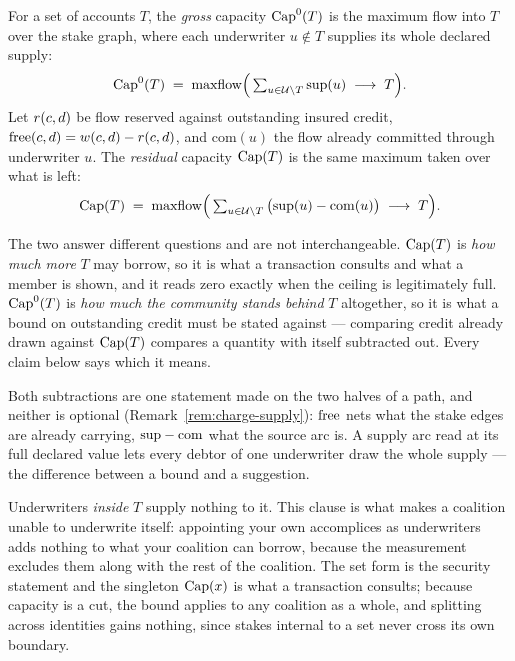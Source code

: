 \begin{definition}[Capacity]
\label{def:capacity}
For a set of accounts $T$, the \emph{gross} capacity $\mathrm{Cap}^{0}(T)$ is the maximum flow
into $T$ over the stake graph, where each underwriter $u \notin T$ supplies its whole
declared supply:
\[
  \mathrm{Cap}^{0}(T) \;=\; \mathrm{maxflow}\Big(\textstyle\sum_{u\in\mathcal{U}\setminus T}\mathrm{sup}(u)
  \;\longrightarrow\; T\Big).
\]
Let $r(c,d)$ be flow reserved against outstanding insured credit,
$\mathrm{free}(c,d) = w(c,d) - r(c,d)$, and $\mathrm{com}(u)$ the flow already committed
through underwriter $u$. The \emph{residual} capacity $\mathrm{Cap}(T)$ is the same maximum
taken over what is left:
\[
  \mathrm{Cap}(T) \;=\; \mathrm{maxflow}\Big(\textstyle\sum_{u\in\mathcal{U}\setminus T}
  \big(\mathrm{sup}(u)-\mathrm{com}(u)\big)
  \;\longrightarrow\; T\Big).
\]
\end{definition}

\begin{remark}
\label{rem:two-capacities}
The two answer different questions and are not interchangeable. $\mathrm{Cap}(T)$ is
\emph{how much more} $T$ may borrow, so it is what a transaction consults and what a
member is shown, and it reads zero exactly when the ceiling is legitimately full.
$\mathrm{Cap}^{0}(T)$ is \emph{how much the community stands behind} $T$ altogether, so it is
what a bound on outstanding credit must be stated against --- comparing credit already
drawn against $\mathrm{Cap}(T)$ compares a quantity with itself subtracted out. Every claim
below says which it means.
\end{remark}

Both subtractions are one statement made on the two halves of a path, and neither is
optional (Remark~\ref{rem:charge-supply}): $\mathrm{free}$ nets what the stake edges are already
carrying, $\mathrm{sup}-\mathrm{com}$ what the source arc is. A supply arc read at its full
declared value lets every debtor of one underwriter draw the whole supply --- the
difference between a bound and a suggestion.

Underwriters \emph{inside} $T$ supply nothing to it. This clause is what makes a
coalition unable to underwrite itself: appointing your own accomplices as underwriters
adds nothing to what your coalition can borrow, because the measurement excludes them
along with the rest of the coalition. The set form is the security statement and the
singleton $\mathrm{Cap}(x)$ is what a transaction consults; because capacity is a cut, the bound
applies to any coalition as a whole, and splitting across identities gains nothing, since
stakes internal to a set never cross its own boundary.

